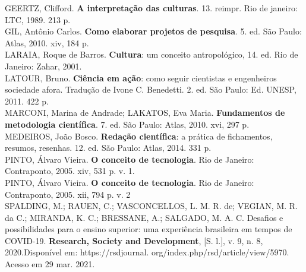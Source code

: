 \singlespacing
\noindent GEERTZ, Clifford. \textbf{A interpretação das culturas}. 13. reimpr. Rio de janeiro: LTC, 1989. 213 p. 
\\

\singlespacing
\noindent GIL, Antônio Carlos. \textbf{Como elaborar projetos de pesquisa}. 5. ed. São Paulo: Atlas, 2010. xiv, 184 p. 
\\

\singlespacing
\noindent LARAIA, Roque de Barros. \textbf{Cultura}: um conceito antropológico, 14. ed. Rio de Janeiro: Zahar, 2001. 
\\

\singlespacing
\noindent LATOUR, Bruno. \textbf{Ciência em ação}: como seguir cientistas e engenheiros sociedade afora. Tradução de Ivone C. Benedetti. 2. ed. São Paulo: Ed. UNESP, 2011. 422 p. 
\\

\singlespacing
\noindent MARCONI, Marina de Andrade; LAKATOS, Eva Maria. \textbf{Fundamentos de metodologia científica}. 7. ed. São Paulo: Atlas, 2010. xvi, 297 p. 
\\

\singlespacing
\noindent MEDEIROS, João Bosco. \textbf{Redação científica}: a prática de fichamentos, resumos, resenhas. 12. ed. São Paulo: Atlas, 2014. 331 p. 
\\

\singlespacing
\noindent PINTO, Álvaro Vieira. \textbf{O conceito de tecnologia}. Rio de Janeiro: Contraponto, 2005. xiv, 531 p. v. 1. 
\\

\singlespacing
\noindent PINTO, Álvaro Vieira. \textbf{O conceito de tecnologia}. Rio de Janeiro: Contraponto, 2005. xii, 794 p. v. 2 
\\

\singlespacing
\noindent SPALDING, M.; RAUEN, C.; VASCONCELLOS, L. M. R. de; VEGIAN, M. R. da C.; MIRANDA, K. C.; BRESSANE, A.; SALGADO, M. A. C. Desafios e possibilidades para o ensino superior: uma experiência brasileira em tempos de COVID-19. \textbf{Research, Society and Development}, [S. l.], v. 9, n. 8, 2020.Disponível em: https://rsdjournal. org/index.php/rsd/article/view/5970. Acesso em 29 mar. 2021.